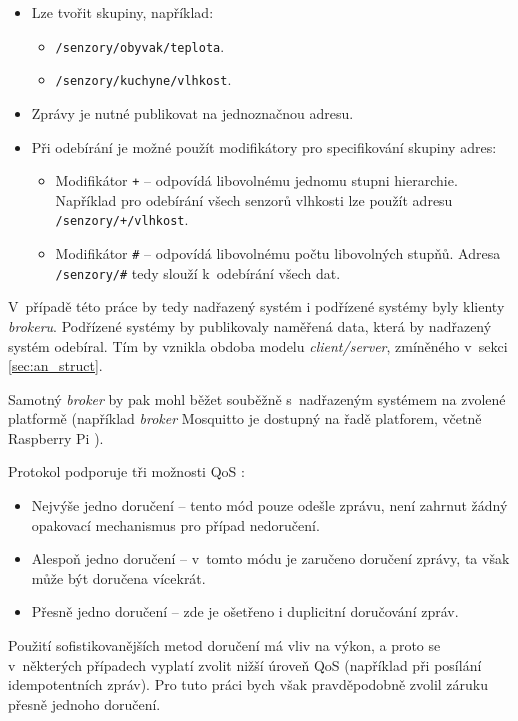 \begin{itemize}

\item Lze tvořit skupiny, například:
    \begin{itemize}
        \item \verb|/senzory/obyvak/teplota|.
        \item \verb|/senzory/kuchyne/vlhkost|.
    \end{itemize}
\item Zprávy je nutné publikovat na jednoznačnou adresu.
\item Při odebírání je možné použít modifikátory pro specifikování skupiny adres:
    \begin{itemize}
        \item Modifikátor \verb|+| -- odpovídá libovolnému jednomu stupni hierarchie. Například pro odebírání všech senzorů vlhkosti lze použít adresu \verb|/senzory/+/vlhkost|.
        \item Modifikátor \verb|#| -- odpovídá libovolnému počtu libovolných stupňů. Adresa \verb|/senzory/#| tedy slouží k~odebírání všech dat.
    \end{itemize}
\end{itemize}

V~případě této práce by tedy nadřazený systém i podřízené systémy byly klienty \textit{brokeru}. Podřízené systémy by publikovaly naměřená data, která by nadřazený systém odebíral. Tím by vznikla obdoba modelu \textit{client/server}, zmíněného v~sekci \ref{sec:an_struct}. 

Samotný \textit{broker} by pak mohl běžet souběžně s~nadřazeným systémem na zvolené platformě (například \textit{broker} Mosquitto je dostupný na řadě platforem, včetně Raspberry Pi \cite{mqtt_mosquitto_wiki}).

Protokol podporuje tři možnosti QoS \cite{mqtt_valerie}:

\begin{itemize}
    \item Nejvýše jedno doručení -- tento mód pouze odešle zprávu, není zahrnut žádný opakovací mechanismus pro případ nedoručení.
    \item Alespoň jedno doručení -- v~tomto módu je zaručeno doručení zprávy, ta však může být doručena vícekrát.
    \item Přesně jedno doručení -- zde je ošetřeno i duplicitní doručování zpráv.
\end{itemize}

Použití sofistikovanějších metod doručení má vliv na výkon, a proto se v~některých případech vyplatí zvolit nižší úroveň QoS (například při posílání idempotentních zpráv). Pro tuto práci bych však pravděpodobně zvolil záruku přesně jednoho doručení.

